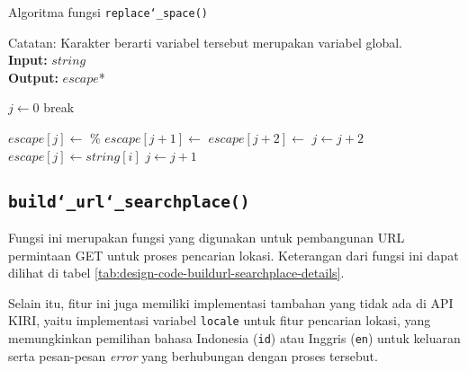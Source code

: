 \begin{algorithm}[h]
	\caption{Algoritma fungsi \texttt{replace\char`_space()}}
	\label{alg:design-replacespace}
	\vspace{-0.6\baselineskip}
	\begin{flushleft}
		Catatan: Karakter \textquotesingle *\textquotesingle\xspace berarti variabel tersebut merupakan variabel global.\\
        \textbf{Input:} $string$ \\
        \textbf{Output:} $escape$* \\
	\end{flushleft}
	\vspace{-1.05\baselineskip}
	\begin{algorithmic}
		\State $j \gets 0$
			 
			    \State break 
			\EndIf
		
			\If{$string[i]$ == \textquotesingle\xspace\textquotesingle}
			    \State $escape[j] \gets$ \textquotesingle\%\textquotesingle
			    \State $escape[j + 1] \gets$ \textquotesingle
			    \State $escape[j + 2] \gets$ \textquotesingle
			    \State $j \gets j + 2$ 
			\Else
				\State $escape[j] \gets string[i]$ 
			\EndIf
			\State $j \gets j + 1$
		\EndFor
	\end{algorithmic}
\end{algorithm}

\subsection{\texttt{build\char`_url\char`_searchplace()}}
\label{sec:design-code-buildurl-searchplace}

Fungsi ini merupakan fungsi yang digunakan untuk pembangunan URL permintaan	GET untuk proses pencarian lokasi. Keterangan dari fungsi ini dapat dilihat di tabel \ref{tab:design-code-buildurl-searchplace-details}.
	
	Selain itu, fitur ini juga memiliki implementasi tambahan yang tidak ada di API KIRI, yaitu implementasi variabel \verb|locale| untuk fitur pencarian lokasi, yang memungkinkan pemilihan bahasa Indonesia (\verb|id|) atau Inggris (\verb|en|) untuk keluaran serta pesan-pesan \textit{error} yang berhubungan dengan proses tersebut.

